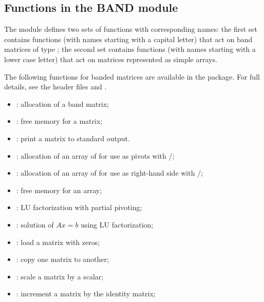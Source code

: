\subsection{Functions in the BAND module}\label{ss:band}

The {\band} module defines two sets of functions with corresponding names:
the first set contains functions (with names starting with a capital letter)
that act on band matrices of type ; the second set contains functions
(with names starting with a lower case letter) that act on matrices represented 
as simple arrays.

The following functions for  banded matrices are available
in the {\band} package.  For full details, see the header files
 and .
\begin{itemize}
\item {}: allocation of a  band matrix;
\item {}: free memory for a  matrix;
\item {}: print a  matrix to standard output.
\item {}: allocation of an array of  for use
  as pivots with /;
\item {}: allocation of an array of  for use
  as right-hand side with /;
\item {}: free memory for an array;
\item {}: LU factorization with partial pivoting;
\item {}: solution of $Ax = b$ using LU factorization;
\item {}: load a matrix with zeros;
\item {}: copy one matrix to another;
\item {}: scale a matrix by a scalar;
\item {}: increment a matrix by the identity matrix;
\end{itemize}


